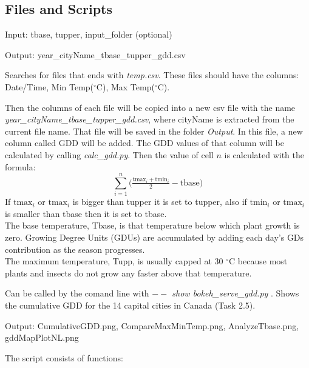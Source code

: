 \documentclass[12pt]{article}
\begin{document}
\subsection{Files and Scripts}
\begin{description}
\item[gdd.py]
\item Input: tbase, tupper, input\_folder (optional)
\item Output: year\_cityName\_tbase\_tupper\_gdd.csv
\item Searches for files that ends with \emph{temp.csv}. These
files should have the columns: Date/Time, Min Temp(${}^\circ$C), Max Temp(${}^\circ$C).

Then the columns of each file will be copied into a new csv file with the name
\emph{year\_cityName\_tbase\_tupper\_gdd.csv}, where cityName is extracted from the
current file name. That file will be saved in the folder \emph{Output}.
In this file, a new column called GDD will be added. The GDD values of that column 
will be calculated by calling \emph{calc\_gdd.py}.
Then the value of cell $n$ is calculated with the formula:
$$
\sum_{i=1}^n \big( \tfrac{\text{tmax}_i+\text{tmin}_i}{2}-\text{tbase}\big)
$$
If $\text{tmax}_i$ or $\text{tmax}_i$ is bigger than tupper it is set to tupper,
 also if $\text{tmin}_i$ or $\text{tmax}_i$ 
is  smaller than tbase then it is set to tbase.
\\The base temperature, Tbase, is that temperature below which plant growth is zero.
 Growing Degree Units (GDUs) are accumulated by adding each day's GDs contribution as the season progresses.
\\ The maximum temperature, Tupp, is usually capped at 30 ${}^\circ$C because most plants and 
insects do not grow any faster above that temperature.

\item[bokeh\_serve\_gdd.py]
\item Can be called by the comand line with \emph{$--$ show bokeh\_serve\_gdd.py} .
Shows the cumulative GDD for the 14 capital cities in Canada (Task 2.5).

\item[create\_plots.py]
\item Output: CumulativeGDD.png, CompareMaxMinTemp.png, AnalyzeTbase.png, gddMapPlotNL.png
\item The script consists of functions:


\end{description}
\end{document}
